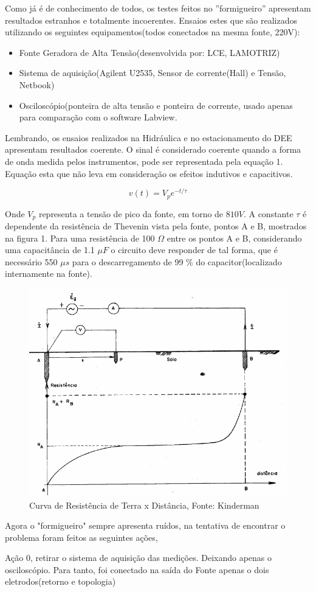 \documentclass[paper=a4, fontsize=11pt]{article}
\begin{document}
Como já é de conhecimento de todos, os testes feitos no ''formigueiro'' apresentam
resultados estranhos e totalmente incoerentes. Ensaios estes que 
são realizados utilizando os seguintes equipamentos(todos conectados na mesma fonte, 220V):
\begin{itemize}
    \item Fonte Geradora de Alta Tensão(desenvolvida por: LCE, LAMOTRIZ)
\item Sistema de aquisição(Agilent U2535, Sensor de corrente(Hall) e Tensão, Netbook)
\item Osciloscópio(ponteira de alta tensão e ponteira de corrente, usado apenas 
para comparação com o software Labview.
\end{itemize}

Lembrando, os ensaios realizados na Hidráulica e no estacionamento do DEE 
apresentam resultados coerente. O sinal é considerado coerente quando a forma de onda
medida pelos instrumentos, pode ser representada pela equação 1. Equação esta que 
não leva em consideração os efeitos indutivos e capacitivos. 

\begin{equation}
v(t) = V_p e^{-t/\tau}
\end{equation}

Onde $V_p$ representa a tensão de pico da fonte, em torno de $810 V$. A constante
$\tau$ é dependente da resistência de Thevenin vista pela fonte, pontos A e B, mostrados
na figura 1. Para uma resistência de 100 $\Omega$ entre os pontos A e B, considerando
uma capacitância de 1.1 $\mu F$
o circuito 
deve responder de tal forma, que é necessário 550 $\mu s$ para o descarregamento de 
99 $\%$ do capacitor(localizado internamente na fonte).

\begin{figure}[!ht]
    \centering
    \includegraphics[scale=.4]{medicao.png}
    \caption{Curva de Resistência de Terra x Distância, Fonte: Kinderman}
\end{figure}
Agora o "formigueiro" sempre apresenta ruídos, na tentativa de encontrar o 
problema foram feitos as seguintes ações,

Ação 0, retirar o sistema de aquisição das medições. Deixando apenas o osciloscópio.
Para tanto, foi conectado na saída do Fonte apenas o  dois eletrodos(retorno e topologia)
\end{document}

